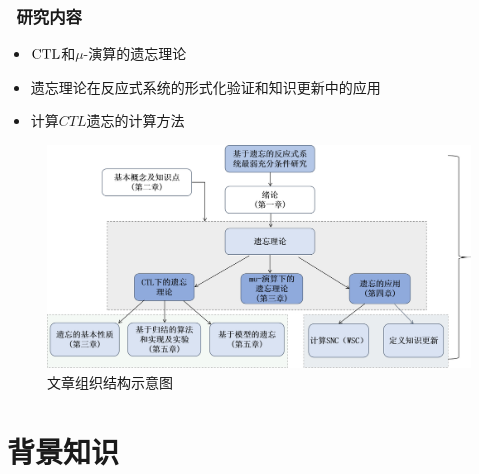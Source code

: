 \documentclass[9pt, CJK]{beamer}
\begin{document}
\begin{frame}
	\frametitle{~研究内容}
		\begin{itemize}
		\item  $\textrm{CTL}$和$\mu$-演算的遗忘理论
		\item 遗忘理论在反应式系统的形式化验证和知识更新中的应用
		\item 计算$CTL$遗忘的计算方法
	\end{itemize}
	\begin{figure}
		\includegraphics[scale=0.3]{figures/zuzhi1}
		\caption{文章组织结构示意图}
	\end{figure}
\end{frame}

\section{背景知识}
\end{document}
